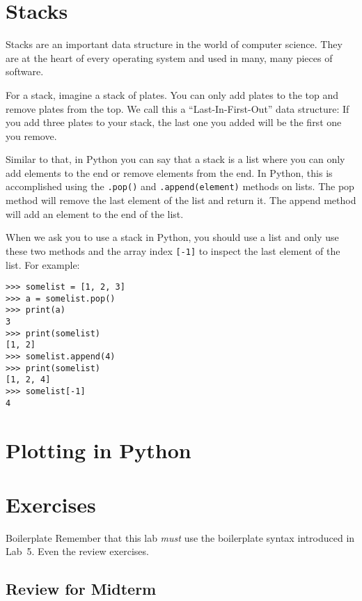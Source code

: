 \documentclass[11pt]{cselabheader}
\begin{document}
\pagebreak
\section{Stacks}

Stacks are an important data structure in the world of computer
science. They are at the heart of every operating system and used in many, many
pieces of software.

For a stack, imagine a stack of plates. You can only add plates to the top and
remove plates from the top. We call this a ``Last-In-First-Out'' data structure:
If you add three plates to your stack, the last one you added will be the first
one you remove.

Similar to that, in Python you can say that a stack
is a list where you can only add elements to the end or remove elements from the
end. In Python, this is accomplished using the
\lstinline!.pop()! and \lstinline!.append(element)! methods on lists. The pop
method will remove the last element of the list and return it. The append method
will add an element to the end of the list.

When we ask you to use a stack in Python, you should use a list and only use
these two methods and the array index \lstinline![-1]! to inspect the last
element of the list. For example:

\begin{lstlisting}[style=ipython]
>>> somelist = [1, 2, 3]
>>> a = somelist.pop()
>>> print(a)
3
>>> print(somelist)
[1, 2]
>>> somelist.append(4)
>>> print(somelist)
[1, 2, 4]
>>> somelist[-1]
4
\end{lstlisting}

\pagebreak

\section{Plotting in Python}



\pagebreak
\section{Exercises}
\label{sec:ex}

\begin{warningbox}{Boilerplate}
  Remember that this lab \emph{must} use the
  boilerplate syntax introduced in Lab~5. Even the review exercises.
\end{warningbox}

\subsection{Review for Midterm}
\end{document}
